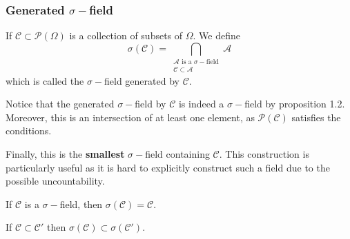 \documentclass{scrartcl}
\begin{document}
  \subsubsection{Generated $\sigma-$field}
  \begin{definition}
    If $\mathcal{C} \subset \mathcal{P}(\Omega)$ is a collection of subsets of $\Omega$. We
    define 
    $$\sigma(\mathcal{C}) = \bigcap_{\substack{\mathcal{A} \text{ is a } \sigma-\text{field} \\
    \mathcal{C} \subset \mathcal{A}}} \mathcal{A}$$
    which is called the $\sigma-$field generated by $\mathcal{C}$. 
  \end{definition}

  Notice that the generated $\sigma-$field by $\mathcal{C}$ is indeed a $\sigma-$field by
  proposition 1.2. Moreover, this is an intersection of at least one element, as
  $\mathcal{P}(\mathcal{C})$ satisfies the conditions.

  Finally, this is the \textbf{smallest} $\sigma-$field containing $\mathcal{C}$. This
  construction is particularly useful as it is hard to explicitly construct such a field due to
  the possible uncountability.

  \begin{remark}
      If $\mathcal{C}$ is a $\sigma-$field, then $\sigma(\mathcal{C}) = \mathcal{C}$.
  \end{remark}

  \begin{proposition}
      If $\mathcal{C} \subset \mathcal{C}'$ then $\sigma(\mathcal{C}) \subset
      \sigma(\mathcal{C}')$. 
  \end{proposition}
  
\end{document}
